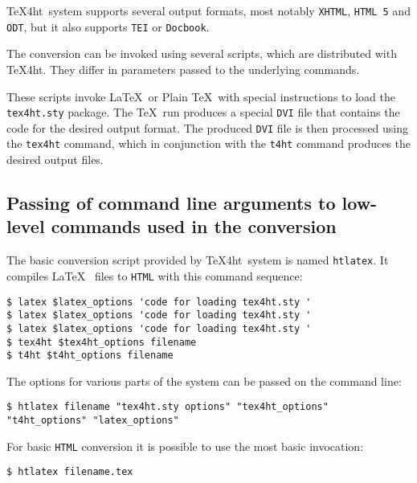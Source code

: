 \label{sec:htlatex}

\TeX4ht~system supports several output formats, most notably
\texttt{XHTML}, \texttt{HTML\ 5} and \texttt{ODT}, but it also supports
\texttt{TEI} or \texttt{Docbook}.

The conversion can be invoked using several scripts, which are
distributed with \TeX4ht. They differ in parameters passed to the
underlying commands.

These scripts invoke \LaTeX~or Plain \TeX~with special instructions to
load the \texttt{tex4ht.sty} package. The \TeX~run produces a special
\texttt{DVI} file that contains the code for the desired output format.
The produced \texttt{DVI} file is then processed using the
\texttt{tex4ht} command, which in conjunction with the \texttt{t4ht}
command produces the desired output files.

\hypertarget{passing-of-command-line-arguments-to-low-level-commands-used-in-the-conversion}{%
\subsection{Passing of command line arguments to low-level commands used
in the
conversion}\label{passing-of-command-line-arguments-to-low-level-commands-used-in-the-conversion}}

The basic conversion script provided by \TeX4ht~system is named
\texttt{htlatex}. It compiles \LaTeX~ files to \texttt{HTML} with this
command sequence:

\begin{verbatim}
$ latex $latex_options 'code for loading tex4ht.sty '
$ latex $latex_options 'code for loading tex4ht.sty '
$ latex $latex_options 'code for loading tex4ht.sty '
$ tex4ht $tex4ht_options filename
$ t4ht $t4ht_options filename
\end{verbatim}

The options for various parts of the system can be passed on the command
line:

\begin{verbatim}
$ htlatex filename "tex4ht.sty options" "tex4ht_options" "t4ht_options" "latex_options"
\end{verbatim}

For basic \texttt{HTML} conversion it is possible to use the most basic
invocation:

\begin{verbatim}
$ htlatex filename.tex
\end{verbatim}

